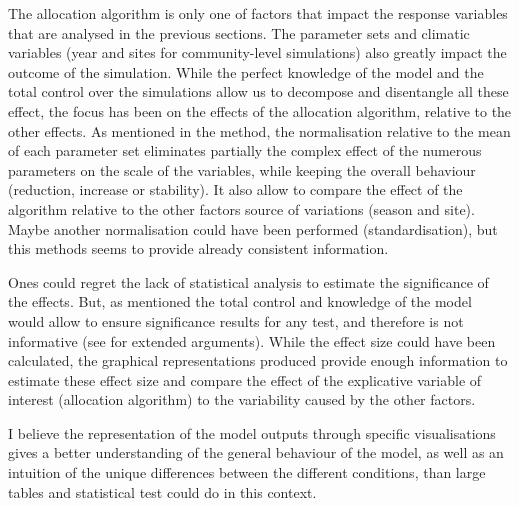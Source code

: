 The allocation algorithm is only one of factors that impact the response variables that are analysed in the previous sections. The parameter sets and climatic variables (year and sites for community-level simulations) also greatly impact the outcome of the simulation. While the perfect knowledge of the model and the total control over the simulations allow us to decompose and disentangle all these effect, the focus has been on the effects of the allocation algorithm, relative to the other effects. As mentioned in the method, the normalisation relative to the mean of each parameter set eliminates partially the complex effect of the numerous parameters on the scale of the variables, while keeping the overall behaviour (reduction, increase or stability). It also allow to compare the effect of the algorithm relative to the other factors source of variations (season and site). Maybe another normalisation could have been performed (standardisation), but this methods seems to provide already consistent information.

Ones could regret the lack of statistical analysis to estimate the significance of the effects. But, as mentioned the total control and knowledge of the model would allow to ensure significance results for any test, and therefore is not informative (see \cite{white_ecologists_2014} for extended arguments). While the effect size could have been calculated, the graphical representations produced provide enough information to estimate these effect size and compare the effect of the explicative variable of interest (allocation algorithm) to the variability caused by the other factors. 

I believe the representation of the model outputs through specific visualisations gives a better understanding of the general behaviour of the model, as well as an intuition of the unique differences between the different conditions, than large tables and statistical test could do in this context. 




